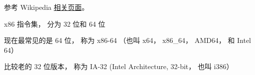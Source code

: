 
\begin{issues}
\issueDraft
\end{issues}

参考 Wikipedia \href{https://en.wikipedia.org/wiki/X86-64}{相关页面}。

x86 指令集， 分为 32 位和 64 位

现在最常见的是 64 位， 称为 x86-64 （也叫 x64， x86_64， AMD64， 和 Intel 64）

比较老的 32 位版本， 称为 IA-32 (Intel Architecture, 32-bit， 也叫 i386）
